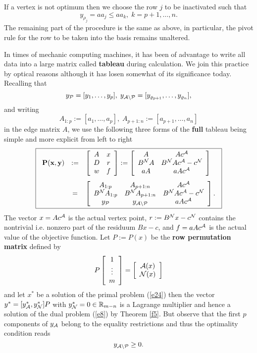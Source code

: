 If a vertex is not optimum then we choose the row $j$ to be inactivated such
that
\[
y_{\rho _j} = aa_j \leq aa_k, \; k = p+1, \ldots, n.
\]
The remaining part of the procedure is the same as above, in particular, the
pivot rule for the row to be taken into the basis remains unaltered.
\par
In times of mechanic computing machines, it has been of advantage to write
all data into a large matrix called {\bf tableau} during calculation.  We
join this practice by optical reasons although it has losen somewhat of its
significance today. Recalling that
\[
y_{\P} = [y_1, \ldots, y_p], \;
y_{\A \backslash \P} = [y_{\rho _{p+1}}, \ldots, y_{\rho _n}],
\]
and writing
\[
A_{1:p} := [a_1, \ldots,a_p], \;
A_{p+1:n} := [a_{p+1}, \ldots, a_n]
\]
in the edge matrix $A$, we use the following three forms of the {\bf full}
tableau being simple and more explicit from left to right
%
%
\begin{equation} \label{e36}
\fbox{$
\ba{.}{rcl}
{\bf P(x,y)} &:=&
\ba{[}{cc} A & x\\ D & r\\w & f
\ea{]}
:=
\ba{[}{cc} A & Ac^{\A}\\B^{\N}A & B^{\N}Ac^{\A} - c^{\N}\\aA &
aAc^{\A} \ea{]}\\[7mm]
&=&
\ba{[}{ccc} A_{1:p} &  A_{p+1:n}           & Ac^{\A}\\
      B^{\N}A_{1:p} & B^{\N}A_{p+1:n}      & B^{\N}Ac^{\A} - c^{\N}\\
       y_{\P}       & y_{\A \backslash \P} & aAc^{\A} \ea{]}.
\ea{.}
$}
\end{equation}
The vector $x = Ac^{\A}$ is the actual vertex point, $r := B^{\N}x - c^{\N}$
contains the nontrivial i.e.  nonzero part of the residuum $Bx - c$, and $f =
aAc^{\A}$ is the actual value of the objective function.
Let $P := P(x)$ be the {\bf row permutation matrix} defined by
\[
P\ba{[}{c}1\\ \vdots\\m \ea{]} = \ba{[}{c}\A(x) \\ \N(x) \ea{]}
\]
and let $x^*$ be a solution of the primal problem (\ref{e24}) then the vector
$y^* = [y^*_{\A}, y^*_{\N}]P$ with $y^*_{\N} = 0 \in \Bbb{R}_{m-n}$ is a {\sc
Lagrange} multiplier and hence a solution of the dual problem (\ref{e8}) by
Theorem \ref{f5}.  But observe that the first $p$ components of $y_{\A}$ belong
to the equality restrictions and thus the optimality condition reads
\[
y_{\A \backslash \P} \geq 0.
\]
\par
